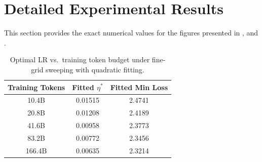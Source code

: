 \documentclass{article}
\begin{document}
\section{Detailed Experimental Results}
\label{app:detailed-tables}

This section provides the exact numerical values for the figures presented in ,  and .

\begin{table}[H]
\centering
\caption{Optimal LR vs.\ training token budget under fine-grid sweeping with quadratic fitting.}
\label{tab:data-scaling}
\vspace{0.1cm}
\begin{tabular}{ccc}
\toprule
\textbf{Training Tokens} & \textbf{Fitted $\eta^*$} & \textbf{Fitted Min Loss} \\
\midrule
10.4B  & 0.01515 & 2.4741 \\
20.8B  & 0.01208 & 2.4189 \\
41.6B  & 0.00958 & 2.3773 \\
83.2B  & 0.00772 & 2.3456 \\
166.4B & 0.00635 & 2.3214 \\
\bottomrule
\end{tabular}
\end{table}


\begin{table}[H]
\centering
\caption{Validation loss vs.\ LR across model depth at a fixed token budget of 10.4B without Depth-$\mu$P.}
\label{tab:depth-scaling}
\vspace{0.1cm}
\end{table}
\end{document}
